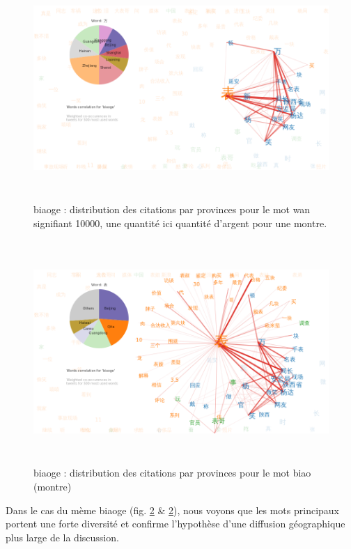 \begin{figure}[H]
    \centering
    \includegraphics[width=6.0087in,height=3.3386in]{figures/chap4/chapitre4-img59.png}
    \caption{
      biaoge : distribution des citations par provinces pour le mot wan signifiant 10000, une quantit\'e ici quantit\'e d{\textquoteright}argent pour une montre.
    }
    \label{fig:biaoge-words-pie-wan}
\end{figure}
 



\begin{figure}[H]
  \centering
  \includegraphics[width=6.0087in,height=3.3386in]{figures/chap4/chapitre4-img60.png}
  \caption{
     biaoge : distribution des citations par provinces pour le mot biao (montre)
  }
  \label{fig:biaoge-words-pie-biao}
\end{figure}


Dans le cas du m\`eme biaoge (fig. \ref{fig:biaoge-words-pie-biao} \& \ref{fig:biaoge-words-pie-biao}), nous voyons que les mots principaux
portent une forte diversit\'e et confirme l{\textquoteright}hypoth\`ese
d{\textquoteright}une diffusion g\'eographique plus large de la
discussion.


